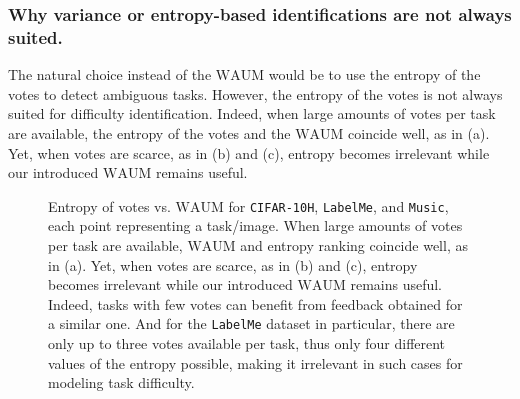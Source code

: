 \subsubsection{Why variance or entropy-based identifications are not always suited.}

The natural choice instead of the $\mathrm{WAUM}$ would be to use the entropy of the votes to detect ambiguous tasks. However, the entropy of the votes is not always suited for difficulty identification.
Indeed, when large amounts of votes per task are available, the entropy of the votes and the $\mathrm{WAUM}$ coincide well, as in (a).
Yet, when votes are scarce, as in (b) and (c), entropy becomes irrelevant while our introduced $\mathrm{WAUM}$ remains useful.

\begin{figure}[thb]
    \centering
    \hfill
    \hfill
    \hfill
    \hfill
    \caption{Entropy of votes vs. $\mathrm{WAUM}$ for \texttt{CIFAR-10H}, \texttt{LabelMe}, and \texttt{Music}, each point representing a task/image. When large amounts of votes per task are available, $\mathrm{WAUM}$ and entropy ranking coincide well, as in (a). Yet, when votes are scarce, as in (b) and (c), entropy becomes irrelevant while our introduced $\mathrm{WAUM}$ remains useful. Indeed, tasks with few votes can benefit from feedback obtained for a similar one. And for the \texttt{LabelMe} dataset in particular, there are only up to three votes available per task, thus only four different values of the entropy possible, making it irrelevant in such cases for modeling task difficulty.}
    \label{fig:entropy_vs_waum}%
\end{figure}

